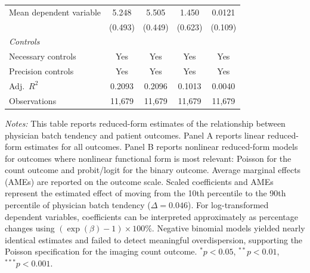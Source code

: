 \documentclass[11pt]{article}
\newcommand{\1}{\hbox{\rm 1\kern-.35em 1}}
\begin{document}
\begin{table}[t!]
\begin{threeparttable}
\begin{tabular}{p{5.2cm}cccc}
Mean dependent variable
& 5.248 & 5.505 & 1.450 & 0.0121 \\
& (0.493) & (0.449) & (0.623) & (0.109) \\

\midrule
\textit{Controls} \\
Necessary controls & Yes & Yes & Yes & Yes \\
Precision controls & Yes & Yes & Yes & Yes \\

\midrule
Adj.\ $R^2$
& 0.2093 & 0.2096 & 0.1013 & 0.0040 \\

Observations
& 11{,}679 & 11{,}679 & 11{,}679 & 11{,}679 \\
\bottomrule
\end{tabular}

\begin{flushleft}
\footnotesize
\textit{Notes:}
This table reports reduced-form estimates of the relationship between physician batch tendency and patient outcomes. Panel A reports linear reduced-form estimates for all outcomes. Panel B reports nonlinear reduced-form models for outcomes where nonlinear functional form is most relevant: Poisson for the count outcome and probit/logit for the binary outcome. Average marginal effects (AMEs) are reported on the outcome scale. Scaled coefficients and AMEs represent the estimated effect of moving from the 10th percentile to the 90th percentile of physician batch tendency ($\Delta = 0.046$). For log-transformed dependent variables, coefficients can be interpreted approximately as percentage changes using $(\exp(\beta)-1)\times100\%$. Negative binomial models yielded nearly identical estimates and failed to detect meaningful overdispersion, supporting the Poisson specification for the imaging count outcome.
$^{*} p < 0.05$,
$^{**} p < 0.01$,
$^{***} p < 0.001$.
\end{flushleft}

\end{threeparttable}
\end{table}
\end{document}
